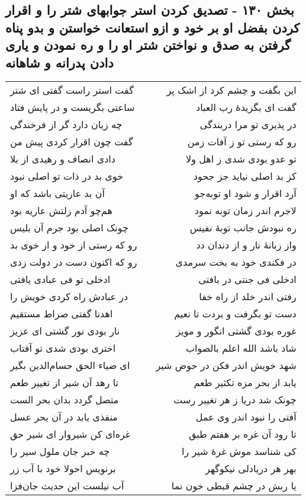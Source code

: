 \begin{center}
\section*{بخش ۱۳۰ - تصدیق کردن استر جوابهای شتر را و اقرار کردن بفضل او بر خود و ازو استعانت خواستن و بدو پناه گرفتن به صدق و نواختن شتر او را و ره نمودن و یاری دادن پدرانه و شاهانه}
\label{sec:sh130}
\begin{longtable}{l p{0.5cm} r}
گفت استر راست گفتی ای شتر
&&
این بگفت و چشم کرد از اشک پر
\\
ساعتی بگریست و در پایش فتاد
&&
گفت ای بگزیدهٔ رب العباد
\\
چه زیان دارد گر از فرخندگی
&&
در پذیری تو مرا دربندگی
\\
گفت چون اقرار کردی پیش من
&&
رو که رستی تو ز آفات زمن
\\
دادی انصاف و رهیدی از بلا
&&
تو عدو بودی شدی ز اهل ولا
\\
خوی بد در ذات تو اصلی نبود
&&
کز بد اصلی نیاید جز جحود
\\
آن بد عاریتی باشد که او
&&
آرد اقرار و شود او توبه‌جو
\\
هم‌چو آدم زلتش عاریه بود
&&
لاجرم اندر زمان توبه نمود
\\
چونک اصلی بود جرم آن بلیس
&&
ره نبودش جانب توبهٔ نفیس
\\
رو که رستی از خود و از خوی بد
&&
واز زبانهٔ نار و از دندان دد
\\
رو که اکنون دست در دولت زدی
&&
در فکندی خود به بخت سرمدی
\\
ادخلی تو فی عبادی یافتی
&&
ادخلی فی جنتی در بافتی
\\
در عبادش راه کردی خویش را
&&
رفتی اندر خلد از راه خفا
\\
اهدنا گفتی صراط مستقیم
&&
دست تو بگرفت و بردت تا نعیم
\\
نار بودی نور گشتی ای عزیز
&&
غوره بودی گشتی انگور و مویز
\\
اختری بودی شدی تو آفتاب
&&
شاد باشد الله اعلم بالصواب
\\
ای ضیاء الحق حسام‌الدین بگیر
&&
شهد خویش اندر فکن در حوض شیر
\\
تا رهد آن شیر از تغییر طعم
&&
یابد از بحر مزه تکثیر طعم
\\
متصل گردد بدان بحر الست
&&
چونک شد دریا ز هر تغییر رست
\\
منفذی یابد در آن بحر عسل
&&
آفتی را نبود اندر وی عمل
\\
غره‌ای کن شیروار ای شیر حق
&&
تا رود آن غره بر هفتم طبق
\\
چه خبر جان ملول سیر را
&&
کی شناسد موش غرهٔ شیر را
\\
برنویس احولا خود با آب زر
&&
بهر هر دریادلی نیکوگهر
\\
آب نیلست این حدیث جان‌فزا
&&
یا ربش در چشم قبطی خون نما
\\
\end{longtable}
\end{center}
